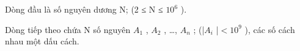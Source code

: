 Dòng đầu là số nguyên dương N; (2 ≤ N ≤ $10^{6}$ ).

Dòng tiếp theo chứa N số nguyên $A_{1}$ , $A_{2}$ , …, $A_{n}$ ; (|$A_{i}$ |$<$$10^{9}$ ), các số cách nhau một dấu cách.